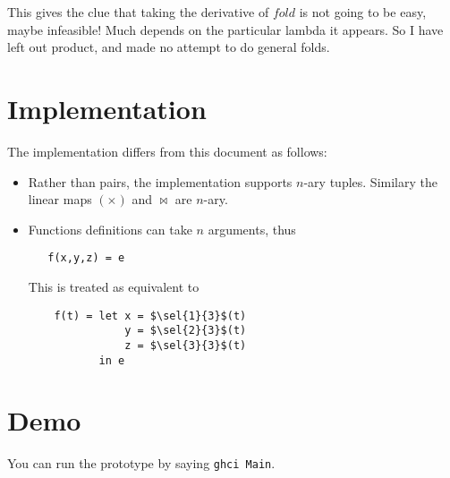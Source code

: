 \documentclass[sigplan,review]{acmart}
\newcommand{\sel}[2]{\pi_{#1,#2}}
\newcommand{\lmpair}{\times}         %
\newcommand{\lmjoin}{\bowtie}        %
\begin{document}
This gives the clue that taking the derivative of $\mathit{fold}$ is
not going to be easy, maybe infeasible!  Much depends on the
particular lambda it appears.  So I have left out product, and made
no attempt to do general folds.


\section{Implementation}

The implementation differs from this document as follows:
\begin{itemize}
\item Rather than pairs, the implementation supports $n$-ary tuples.
  Similary the linear maps $(\lmpair)$ and $\lmjoin$ are $n$-ary.
\item Functions definitions can take $n$ arguments, thus
  \begin{lstlisting}
   f(x,y,z) = e
  \end{lstlisting}
  This is treated as equivalent to
  \begin{lstlisting}
    f(t) = let x = $\sel{1}{3}$(t)
               y = $\sel{2}{3}$(t)
               z = $\sel{3}{3}$(t)
           in e
  \end{lstlisting}
\end{itemize}

\section{Demo}

You can run the prototype by saying {\tt ghci Main}.
\end{document}
